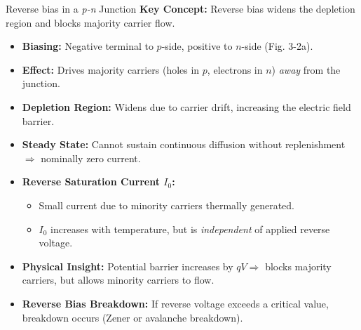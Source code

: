 
\begin{frame}{Reverse bias in a \textit{p-n} Junction}
    \textbf{Key Concept:} Reverse bias widens the depletion region and blocks majority carrier flow.
    \begin{itemize}
        \item \textbf{Biasing:} Negative terminal to $p$-side, positive to $n$-side (Fig. 3-2a).
        \item \textbf{Effect:} Drives majority carriers (holes in $p$, electrons in $n$) \textit{away} from the junction.
        \item \textbf{Depletion Region:} Widens due to carrier drift, increasing the electric field barrier.
        \item \textbf{Steady State:} Cannot sustain continuous diffusion without replenishment $\Rightarrow$ nominally zero current.
        \item \textbf{Reverse Saturation Current $I_0$:}
        \begin{itemize}
            \item Small current due to minority carriers thermally generated.
            \item $I_0$ increases with temperature, but is \textit{independent} of applied reverse voltage.
        \end{itemize}
        \item \textbf{Physical Insight:} Potential barrier increases by $qV \Rightarrow$ blocks majority carriers, but allows minority carriers to flow.
		\item \textbf{Reverse Bias Breakdown:} If reverse voltage exceeds a critical value, breakdown occurs (Zener or avalanche breakdown).
    \end{itemize}
\end{frame}



